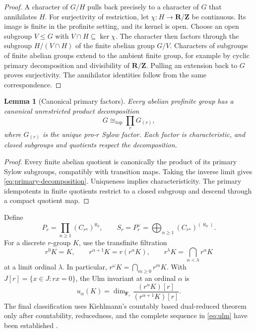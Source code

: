 \documentclass[11pt]{article}
\newtheorem{lemma}[theorem]{Lemma}
\theoremstyle{definition}
\newcommand{\TopIso}{\cong_{\mathrm{top}}}
\begin{document}
\begin{proof}
A character of $G/H$ pulls back precisely to a character of $G$ that
annihilates $H$.  For surjectivity of restriction, let
$\chi:H\to\mathbf R/\mathbf Z$ be continuous.  Its image is finite in the
profinite setting, and its kernel is open.  Choose an open subgroup $V\le G$
with $V\cap H\subseteq\ker\chi$.  The character then factors through the
subgroup $H/(V\cap H)$ of the finite abelian group $G/V$.  Characters of
subgroups of finite abelian groups extend to the ambient finite group, for
example by cyclic primary decomposition and divisibility of
$\mathbf R/\mathbf Z$.  Pulling an extension back to $G$ proves surjectivity.
The annihilator identities follow from the same correspondence.
\end{proof}

\begin{lemma}[Canonical primary factors]\label{lem:primary-decomposition}
Every abelian profinite group has a canonical unrestricted product
decomposition
\begin{equation}\label{eq:primary-decomposition}
G\TopIso\prod_rG_{(r)},
\end{equation}
where $G_{(r)}$ is the unique pro-$r$ Sylow factor.  Each factor is
characteristic, and closed subgroups and quotients respect the decomposition.
\end{lemma}

\begin{proof}
Every finite abelian quotient is canonically the product of its primary
Sylow subgroups, compatibly with transition maps.  Taking the inverse limit
gives \eqref{eq:primary-decomposition}.  Uniqueness implies characteristicity.
The primary idempotents in finite quotients restrict to a closed subgroup and
descend through a compact quotient map.
\end{proof}

Define
\begin{equation}\label{eq:PS}
P_r=\prod_{n\ge1}(C_{r^n})^{\aleph_0},
\qquad
S_r=P_r^\vee=\bigoplus_{n\ge1}(C_{r^n})^{(\aleph_0)}.
\end{equation}
For a discrete $r$-group $K$, use the transfinite filtration
\begin{equation}\label{eq:transfinite-filtration}
r^0K=K,
\qquad r^{\alpha+1}K=r(r^\alpha K),
\qquad r^\lambda K=\bigcap_{\alpha<\lambda}r^\alpha K
\end{equation}
at a limit ordinal $\lambda$.  In particular,
$r^\omega K=\bigcap_{m\ge0}r^mK$.  With
$J[r]=\{x\in J:rx=0\}$, the Ulm invariant at an ordinal $\alpha$ is
\begin{equation}\label{eq:ulm}
u_\alpha(K)=\dim_{\mathbf F_r}
\frac{(r^\alpha K)[r]}{(r^{\alpha+1}K)[r]}.
\end{equation}
The final classification uses Kiehlmann's countably based dual-reduced
theorem only after countability, reducedness, and the complete sequence in
\eqref{eq:ulm} have been established
\citep[Definition~1.3, Theorems~1.4 and~1.8]{Kiehlmann2013}.
\end{document}
